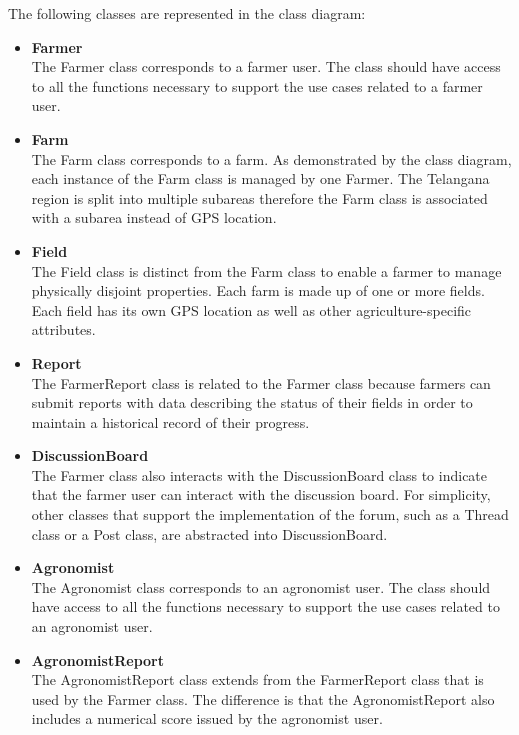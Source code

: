 The following classes are represented in the class diagram:
\begin{itemize}

\item \textbf{Farmer}\\
The Farmer class corresponds to a farmer user. The class should have access to all the functions necessary to support the use cases related to a farmer user. 

\item \textbf{Farm}\\
The Farm class corresponds to a farm. As demonstrated by the class diagram, each instance of the Farm class is managed by one Farmer. The Telangana region is split into multiple subareas therefore the Farm class is associated with a subarea instead of GPS location.

\item \textbf{Field}\\
The Field class is distinct from the Farm class to enable a farmer to manage physically disjoint properties. Each farm is made up of one or more fields. Each field has its own GPS location as well as other agriculture-specific attributes.

\item \textbf{Report}\\
The FarmerReport class is related to the Farmer class because farmers can submit reports with data describing the status of their fields in order to maintain a historical record of their progress. 

\item \textbf{DiscussionBoard}\\
The Farmer class also interacts with the DiscussionBoard class to indicate that the farmer user can interact with the discussion board. For simplicity, other classes that support the implementation of the forum, such as a Thread class or a Post class, are abstracted into DiscussionBoard. 

\item \textbf{Agronomist}\\
The Agronomist class corresponds to an agronomist user. The class should have access to all the functions necessary to support the use cases related to an agronomist user. 

\item \textbf{AgronomistReport}\\
The AgronomistReport class extends from the FarmerReport class that is used by the Farmer class. The difference is that the AgronomistReport also includes a numerical score issued by the agronomist user. 


\end{itemize}
